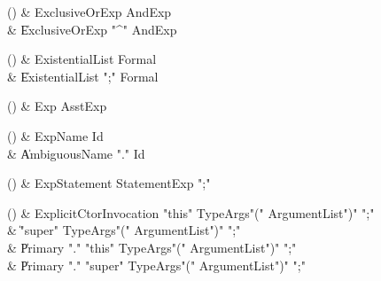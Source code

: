 \begin{bbgrammarappendix}

() & ExclusiveOrExp \label{prod:ExclusiveOrExp}  \: AndExp  \\

 &    \| ExclusiveOrExp \xcd"^" AndExp \\

\end{bbgrammarappendix}

\begin{bbgrammarappendix}

() & ExistentialList \label{prod:ExistentialList}  \: Formal  \\

 &    \| ExistentialList \xcd";" Formal \\

\end{bbgrammarappendix}

\begin{bbgrammarappendix}

() & Exp \label{prod:Exp}  \: AsstExp  \\


\end{bbgrammarappendix}

\begin{bbgrammarappendix}

() & ExpName \label{prod:ExpName}  \: Id  \\

 &    \| AmbiguousName \xcd"." Id \\

\end{bbgrammarappendix}

\begin{bbgrammarappendix}

() & ExpStatement \label{prod:ExpStatement}  \: StatementExp \xcd";"  \\


\end{bbgrammarappendix}

\begin{bbgrammarappendix}

() & ExplicitCtorInvocation \label{prod:ExplicitCtorInvocation}  \: \xcd"this" TypeArgs\opt \xcd"(" ArgumentList\opt \xcd")" \xcd";"  \\

 &    \| \xcd"super" TypeArgs\opt \xcd"(" ArgumentList\opt \xcd")" \xcd";" \\
 &    \| Primary \xcd"." \xcd"this" TypeArgs\opt \xcd"(" ArgumentList\opt \xcd")" \xcd";" \\
 &    \| Primary \xcd"." \xcd"super" TypeArgs\opt \xcd"(" ArgumentList\opt \xcd")" \xcd";" \\

\end{bbgrammarappendix}

